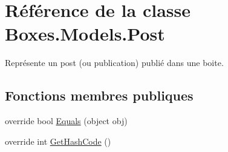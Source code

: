 \hypertarget{class_boxes_1_1_models_1_1_post}{}\section{Référence de la classe Boxes.\+Models.\+Post}
\label{class_boxes_1_1_models_1_1_post}


Représente un post (ou publication) publié dans une boite.  


\subsection*{Fonctions membres publiques}
\begin{DoxyCompactItemize}
\item 
override bool \hyperlink{class_boxes_1_1_models_1_1_post_ad182ce5ae09799d83f86d15f005a68f8}{Equals} (object obj)
\item 
override int \hyperlink{class_boxes_1_1_models_1_1_post_a91226543cb65c9dbc4edd5d7c64aa9dd}{Get\+Hash\+Code} ()
\end{DoxyCompactItemize}
